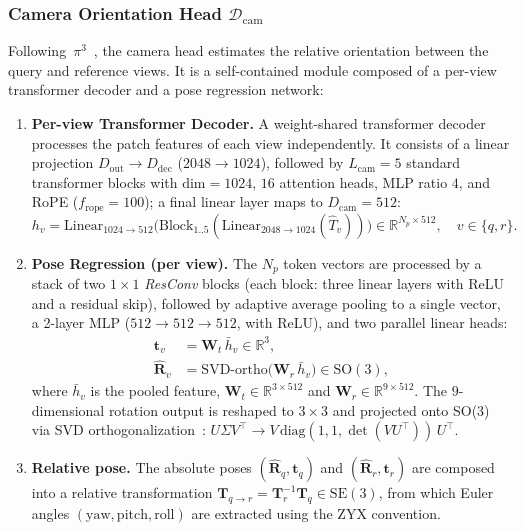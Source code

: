 \subsubsection{Camera Orientation Head $\mathcal{D}_\text{cam}$}
\label{sec:supp_cam_head}
Following~$\pi^3$~\cite{wang2025pi}, the camera head estimates the
relative orientation between the query and reference views.
It is a self-contained module composed of a per-view transformer
decoder and a pose regression network:

\begin{enumerate}[leftmargin=*,topsep=2pt,itemsep=1pt]
\item \textbf{Per-view Transformer Decoder.}
      A weight-shared transformer decoder processes the patch features
      of each view independently. It consists of a linear projection
      $D_\text{out}\to D_\text{dec}$ ($2048\to 1024$), followed by
      $L_\text{cam}=5$ standard transformer blocks with
      $\text{dim}=1024$, $16$ attention heads, MLP ratio $4$, and
      RoPE ($f_\text{rope}=100$); a final linear layer maps to
      $D_\text{cam}=512$:
      \begin{equation}
        h_v = \text{Linear}_{1024\to 512}\!\bigl(
              \text{Block}_{1..5}(\text{Linear}_{2048\to 1024}(\hat{T}_v))\bigr)
              \in\mathbb{R}^{N_p\times 512},
              \quad v\in\{q,r\}.
      \end{equation}

\item \textbf{Pose Regression (per view).}
      The $N_p$ token vectors are processed by a stack of two $1{\times}1$
      \emph{ResConv} blocks (each block: three linear layers with ReLU
      and a residual skip), followed by adaptive average pooling to a
      single vector, a 2-layer MLP ($512\to 512\to 512$, with ReLU),
      and two parallel linear heads:
      \begin{align}
        \mathbf{t}_v &= \mathbf{W}_t\,\bar{h}_v \in\mathbb{R}^{3}, \\
        \hat{\mathbf{R}}_v &= \text{SVD-ortho}\bigl(\mathbf{W}_r\,\bar{h}_v\bigr)
                              \in\text{SO}(3),
      \end{align}
      where $\bar{h}_v$ is the pooled feature, $\mathbf{W}_t\in\mathbb{R}^{3\times 512}$ and $\mathbf{W}_r\in\mathbb{R}^{9\times 512}$. The $9$-dimensional rotation output is reshaped to $3{\times}3$ and projected onto SO(3) via SVD orthogonalization~\cite{svdrotation}: $U\Sigma V^\top\!\to\!V\,\text{diag}(1,1,\det(VU^\top))\,U^\top$.

\item \textbf{Relative pose.}
      The absolute poses $(\hat{\mathbf{R}}_q,\mathbf{t}_q)$ and
      $(\hat{\mathbf{R}}_r,\mathbf{t}_r)$ are composed into a
      relative transformation $\mathbf{T}_{q\to r}=\mathbf{T}_r^{-1}\mathbf{T}_q\in\text{SE}(3)$, from which Euler angles
      $(\text{yaw},\text{pitch},\text{roll})$ are extracted using the
      ZYX convention.
\end{enumerate}

